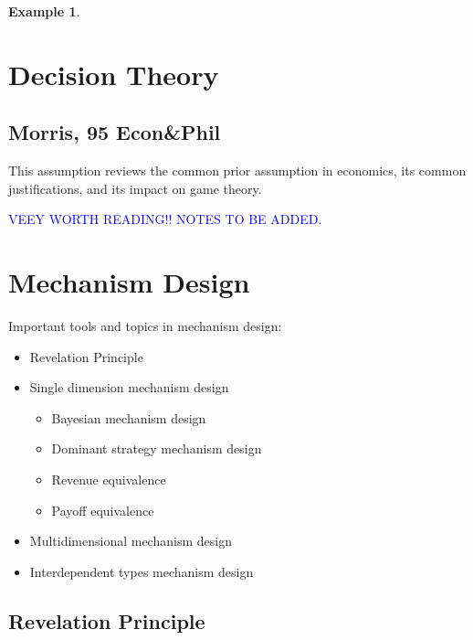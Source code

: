 \documentclass{book}
\theoremstyle{plain}
\theoremstyle{definition}
\newtheorem{exmp}{Example}[section] %
\begin{document}
\begin{exmp}

\end{exmp}


\section{Decision Theory} %
\label{sec:decision_theory}


\subsection{Morris, 95 Econ\&Phil} %
\label{sub:morris_95_econ_phil}


\textbf{}

This assumption reviews the common prior assumption in economics, its common justifications, and its impact on game theory.

\textcolor{blue}{VEEY WORTH READING!! NOTES TO BE ADDED.}




\section{Mechanism Design} %
\label{sec:mechanism_design}

\noindent
Important tools and topics in mechanism design:
\begin{itemize}
	\item Revelation Principle
	\item Single dimension mechanism design
	\begin{itemize}
		\item Bayesian mechanism design
		\item Dominant strategy mechanism design
		\item Revenue equivalence
		\item Payoff equivalence
	\end{itemize}
	\item Multidimensional mechanism design
	\item Interdependent types mechanism design
\end{itemize}


\subsection{Revelation Principle} %
\label{sub:revelation_principle}
\end{document}
